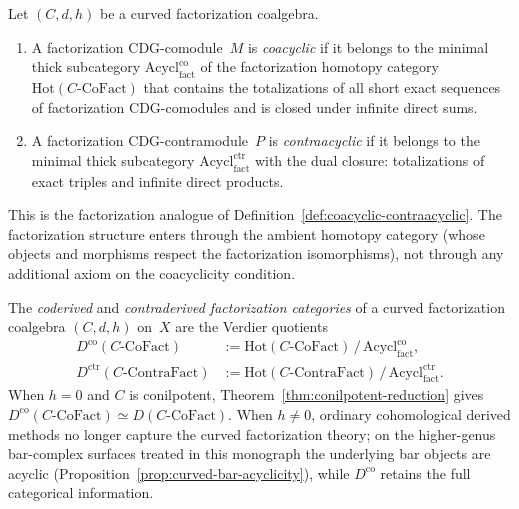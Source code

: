 \begin{definition}
\label{def:coacyclic-fact}
Let $(C, d, h)$ be a curved factorization coalgebra.
\begin{enumerate}[label=\textup{(\roman*)}]
\item A factorization CDG-comodule~$M$ is \emph{coacyclic} if it
  belongs to the minimal thick subcategory
  $\mathrm{Acycl}^{\mathrm{co}}_{\mathrm{fact}}$
  of the factorization homotopy category
  $\mathrm{Hot}(C\text{-}\mathrm{CoFact})$
  that contains the totalizations of all short exact sequences of
  factorization CDG-comodules and is closed under
  infinite direct sums.
\item A factorization CDG-contramodule~$P$ is
  \emph{contraacyclic} if it belongs to the minimal thick
  subcategory
  $\mathrm{Acycl}^{\mathrm{ctr}}_{\mathrm{fact}}$
  with the dual closure: totalizations of exact triples and
  infinite direct products.
\end{enumerate}
This is the factorization analogue of
Definition~\ref{def:coacyclic-contraacyclic}.  The factorization
structure enters through the ambient homotopy category (whose
objects and morphisms respect the factorization isomorphisms), not
through any additional axiom on the coacyclicity condition.
\end{definition}

\begin{definition}
\label{def:coderived-fact}
The \emph{coderived} and \emph{contraderived factorization
categories} of a curved factorization coalgebra $(C, d, h)$
on~$X$ are the Verdier quotients
\begin{align}
D^{\mathrm{co}}(C\text{-}\mathrm{CoFact})
  &:= \mathrm{Hot}(C\text{-}\mathrm{CoFact})
  \,\big/\, \mathrm{Acycl}^{\mathrm{co}}_{\mathrm{fact}},
  \label{eq:coderived-fact}\\
D^{\mathrm{ctr}}(C\text{-}\mathrm{ContraFact})
  &:= \mathrm{Hot}(C\text{-}\mathrm{ContraFact})
  \,\big/\, \mathrm{Acycl}^{\mathrm{ctr}}_{\mathrm{fact}}.
  \label{eq:contraderived-fact}
\end{align}
When $h = 0$ and $C$ is conilpotent,
Theorem~\ref{thm:conilpotent-reduction} gives
$D^{\mathrm{co}}(C\text{-}\mathrm{CoFact})
\simeq D(C\text{-}\mathrm{CoFact})$.
When $h \neq 0$, ordinary cohomological derived methods no longer
capture the curved factorization theory; on the higher-genus
bar-complex surfaces treated in this monograph the underlying bar
objects are acyclic
\textup{(}Proposition~\ref{prop:curved-bar-acyclicity}\textup{)},
while $D^{\mathrm{co}}$ retains the full categorical information.
\end{definition}

